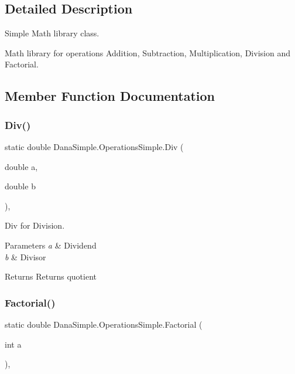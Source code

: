 \subsection{Detailed Description}
Simple Math library class. 

Math library for operations Addition, Subtraction, Multiplication, Division and Factorial. 

\subsection{Member Function Documentation}
\mbox{\label{classDanaSimple_1_1OperationsSimple_a687d612438e1e8926213c86393d6949c}} 
\subsubsection{\texorpdfstring{Div()}{Div()}}
{\footnotesize\ttfamily static double Dana\+Simple.\+Operations\+Simple.\+Div (\begin{DoxyParamCaption}\item[{double}]{a,  }\item[{double}]{b }\end{DoxyParamCaption})\hspace{0.3cm}{\ttfamily [inline]}, {\ttfamily [static]}}



Div for Division. 


\begin{DoxyParams}{Parameters}
{\em a} & Dividend \\
\hline
{\em b} & Divisor \\
\hline
\end{DoxyParams}
\begin{DoxyReturn}{Returns}
Returns quotient 
\end{DoxyReturn}
\mbox{\label{classDanaSimple_1_1OperationsSimple_ac93a09de0f6e8aa3d0eb36ad895e396a}} 
\subsubsection{\texorpdfstring{Factorial()}{Factorial()}}
{\footnotesize\ttfamily static double Dana\+Simple.\+Operations\+Simple.\+Factorial (\begin{DoxyParamCaption}\item[{int}]{a }\end{DoxyParamCaption})\hspace{0.3cm}{\ttfamily [inline]}, {\ttfamily [static]}}



